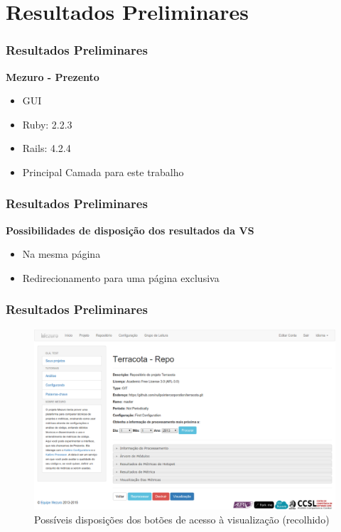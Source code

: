 \documentclass{beamer}
\begin{document}
\section{Resultados Preliminares} %

\begin{frame}
\frametitle{Resultados Preliminares}
\textbf{Mezuro - Prezento}
\begin{itemize}
\item GUI
\item Ruby: 2.2.3
\item Rails: 4.2.4
\item Principal Camada para este trabalho
\end{itemize}
\end{frame}


\begin{frame}
\frametitle{Resultados Preliminares}
\textbf{Possibilidades de disposição dos resultados da VS}
\begin{itemize}
\item Na mesma página
\item Redirecionamento para uma página exclusiva
\end{itemize}
\end{frame}


\begin{frame}
\frametitle{Resultados Preliminares}
\begin{figure}[!htb]
  \centering
    \includegraphics[keepaspectratio=true,scale=0.25]
    {../figuras/exmplo_disposicao_botao_visualizacao_1.eps}
  \caption{Possíveis disposições dos botões de acesso à visualização (recolhido)}
  \label{fig:parallel}
\end{figure}
\end{frame}
\end{document}
